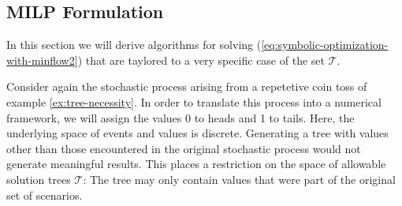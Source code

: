 \subsection{MILP Formulation}
\label{sec:MILP-selection-problem}
In this section we will derive algorithms for solving (\ref{eq:symbolic-optimization-with-minflow2}) that are taylored to a very specific case of the set $\mathcal{T}$.

Consider again the stochastic process arising from a repetetive coin toss of example \ref{ex:tree-necessity}.
In order to translate this process into a numerical framework, we will assign the values 0 to heads and 1 to tails.
Here, the underlying space of events and values is discrete.
Generating a tree with values other than those encountered in the original stochastic process would not generate meaningful results.
This places a restriction on the space of allowable solution trees $\mathcal{T}$: 
The tree may only contain values that were part of the original set of scenarios.

